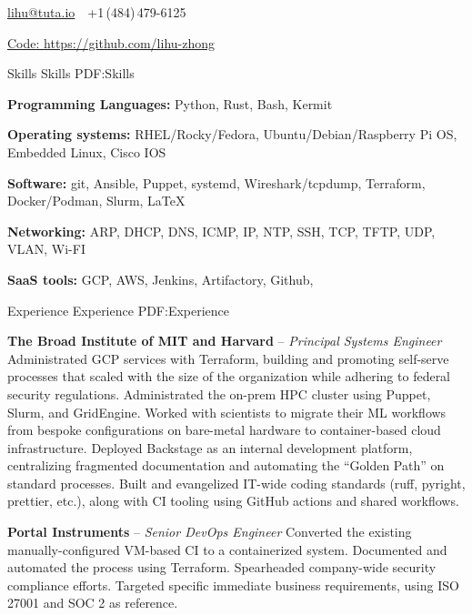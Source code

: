 \documentclass[letterpaper,MMMyyyy,nonstopmode]{simpleresumecv}
\newcommand{\CVAuthor}{Lihu Zhong}
\begin{document}
\Title{\CVAuthor}

\begin{SubTitle}
\href{mailto:lihu@tuta.io}
{lihu@tuta.io}
\,\SubBulletSymbol\,
+1\,(484)\,479-6125
\par
\href{https://github.com/lihu-zhong}
{Code: \url{https://github.com/lihu-zhong}}
\end{SubTitle}

\begin{Body}

\Section
{Skills}
{Skills}
{PDF:Skills}
{\raggedright

\Entry
\textbf{Programming Languages: }
Python,
Rust,
Bash,
Kermit

\Entry
\textbf{Operating systems:}
RHEL/Rocky/Fedora,
Ubuntu/Debian/Raspberry Pi OS,
Embedded Linux,
Cisco IOS

\Entry
\textbf{Software: }
git,
Ansible,
Puppet,
systemd,
Wireshark/tcpdump,
Terraform,
Docker/Podman,
Slurm,
{\LaTeX}

\Entry
\textbf{Networking: }
ARP,
DHCP,
DNS,
ICMP,
IP,
NTP,
SSH,
TCP,
TFTP,
UDP,
VLAN,
Wi-FI

\Entry
\textbf{SaaS tools: }
GCP,
AWS,
Jenkins,
Artifactory,
Github,

}

\Section
{Experience}
{Experience}
{PDF:Experience}

\Entry
\textbf{The Broad Institute of MIT and Harvard}
\hfill
{} --
\Gap
\textit{Principal Systems Engineer}
\Gap
\BulletItem
Administrated GCP services with Terraform, building and promoting self-serve
processes that scaled with the size of the organization while adhering to
federal security regulations.
\BulletItem
Administrated the on-prem HPC cluster using Puppet, Slurm, and GridEngine.
\BulletItem
Worked with scientists to migrate their ML workflows from bespoke configurations
on bare-metal hardware to container-based cloud infrastructure.
\BulletItem
Deployed Backstage as an internal development platform, centralizing fragmented
documentation and automating the ``Golden Path'' on standard processes.
\BulletItem
Built and evangelized IT-wide coding standards (ruff, pyright, prettier,
etc.), along with CI tooling using GitHub actions and shared workflows.

\BigGap

\Entry
\textbf{Portal Instruments}
\hfill
{} --
\Gap
\textit{Senior DevOps Engineer}
\Gap
\BulletItem
Converted the existing manually-configured VM-based CI to a containerized
system. Documented and automated the process using Terraform.
\BulletItem
Spearheaded company-wide security compliance efforts. Targeted specific
immediate business requirements, using ISO 27001 and SOC 2 as reference.


\end{Body}
\end{document}
